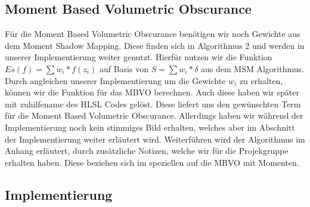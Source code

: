 \documentclass[runningheaders,a4paper]{llncs}
\begin{document}
\subsection{Moment Based Volumetric Obscurance}
Für die Moment Based Volumetric Obscurance benötigen wir noch Gewichte aus dem Moment Shadow Mapping. Diese finden sich in Algorithmus 2 und werden in unserer Implementierung weiter genutzt.
Hierfür nutzen wir die Funktion $Es(f) = \sum w_i*f(z_i)$ \cite{mbvo} auf Basis von $S = \sum w_i*\delta$ aus dem MSM Algorithmus. Durch angleichen unserer Implementierung um die Gewichte $w_i$ zu erhalten, können wir die Funktion für das MBVO berechnen. Auch diese haben wir später mit zuhilfename des HLSL Codes gelöst. Diese liefert uns den gewünschten Term für die Moment Based Volumetric Obscurance. Allerdings haben wir während der Implementierung noch kein stimmiges Bild erhalten, welches aber im Abschnitt der Implementierung weiter erläutert wird. Weiterführen wird der Algorithmus im Anhang erläutert, durch zusätzliche Notizen, welche wir für die Projekgruppe erhalten haben. Diese beziehen sich im speziellen auf die MBVO mit Momenten.\cite{mbvo}

\subsection{Implementierung}
\end{document}
